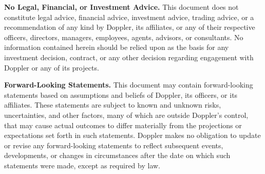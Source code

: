 \documentclass[sigconf,nonacm,prologue,table]{acmart}
\numberwithin{equation}{section}
\theoremstyle{definition}
\theoremstyle{remark}
\begin{document}
\textbf{No Legal, Financial, or Investment Advice.} This document does not constitute legal advice, financial advice, investment advice, trading advice, or a recommendation of any kind by Doppler, its affiliates, or any of their respective officers, directors, managers, employees, agents, advisors, or consultants. No information contained herein should be relied upon as the basis for any investment decision, contract, or any other decision regarding engagement with Doppler or any of its projects.

\textbf{Forward-Looking Statements.} This document may contain forward-looking statements based on assumptions and beliefs of Doppler, its officers, or its affiliates. These statements are subject to known and unknown risks, uncertainties, and other factors, many of which are outside Doppler's control, that may cause actual outcomes to differ materially from the projections or expectations set forth in such statements. Doppler makes no obligation to update or revise any forward-looking statements to reflect subsequent events, developments, or changes in circumstances after the date on which such statements were made, except as required by law.
\end{document}
